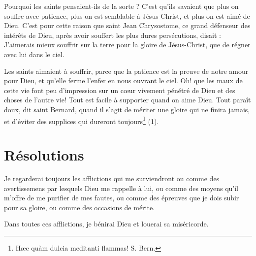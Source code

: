 \documentclass[instructions.tex]{subfiles}
\begin{document}
Pourquoi les saints pensaient-ils de la sorte ? C'est qu'ils savaient que plus on souffre avec patience, plus on est semblable à Jésus-Christ, et plus on est aimé de Dieu. C'est pour cette raison que saint Jean Chrysostome, ce grand défenseur des intérêts de Dieu, après avoir souffert les plus dures persécutions, disait : J'aimerais mieux souffrir sur la terre pour la gloire de Jésus-Christ, que de régner avec lui dans le ciel.
 
Les saints aimaient à souffrir, parce que la patience est la preuve de notre amour pour Dieu, et qu'elle ferme l'enfer en nous ouvrant le ciel. Oh! que les maux de cette vie font peu d'impression sur un cœur vivement pénétré de Dieu et des choses de l'autre vie! Tout est facile à supporter quand on aime Dieu. Tout paraît doux, dit saint Bernard, quand il s'agit de mériter une gloire qui ne finira jamais, et d'éviter des supplices qui dureront toujours\footnote{Hæc quàm dulcia meditanti flammas! S. Bern.} (1).
 
\section{Résolutions}
 
\primo Je regarderai toujours les afflictions qui me surviendront ou comme des avertissemens par lesquels Dieu me rappelle à lui, ou comme des moyens qu'il m'offre de me purifier de mes fautes, ou comme des épreuves que je dois subir pour sa gloire, ou comme des occasions de mérite.
 
\secundo Dans toutes ces afflictions, je bénirai Dieu et louerai sa miséricorde. 


 
\end{document}
